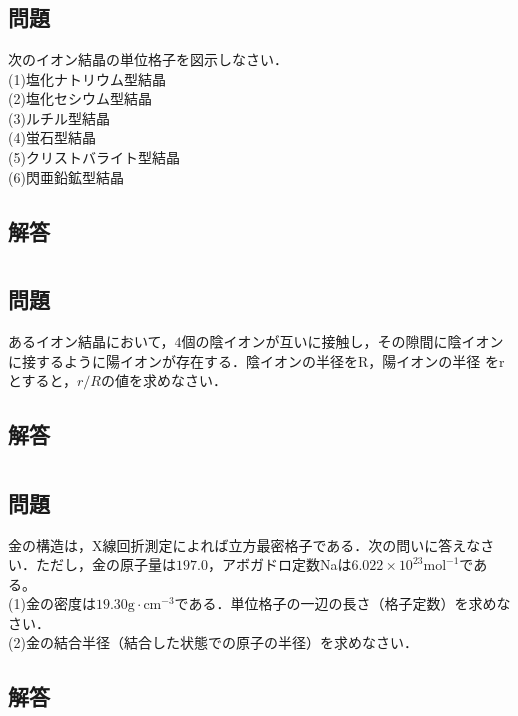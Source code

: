 \documentclass[dvipdfmx]{article}
\begin{document}
\section{} 
  \subsection*{問題} %
    次のイオン結晶の単位格子を図示しなさい．\\
    (1)塩化ナトリウム型結晶\\
    (2)塩化セシウム型結晶\\
    (3)ルチル型結晶\\
    (4)蛍石型結晶\\
    (5)クリストバライト型結晶\\
    (6)閃亜鉛鉱型結晶
  \subsection*{解答}

\section{}
  \subsection*{問題} %
    あるイオン結晶において，$4$個の陰イオンが互いに接触し，その隙間に陰イオンに接するように陽イオンが存在する．陰イオンの半径をR，陽イオンの半径
    をrとすると，$r/R$の値を求めなさい．
  \subsection*{解答}


\section{}
  \subsection*{問題} %
    金の構造は，X線回折測定によれば立方最密格子である．次の問いに答えなさい．ただし，金の原子量は$197.0$，アボガドロ定数Naは$\mathrm{6.022 \times 10^{23}mol^{-1}} $である。\\
    (1)金の密度は$\mathrm {19.30 g \cdot cm^{-3} }$である．単位格子の一辺の長さ（格子定数）を求めなさい．\\
    (2)金の結合半径（結合した状態での原子の半径）を求めなさい．
  \subsection*{解答}
  
\end{document}
